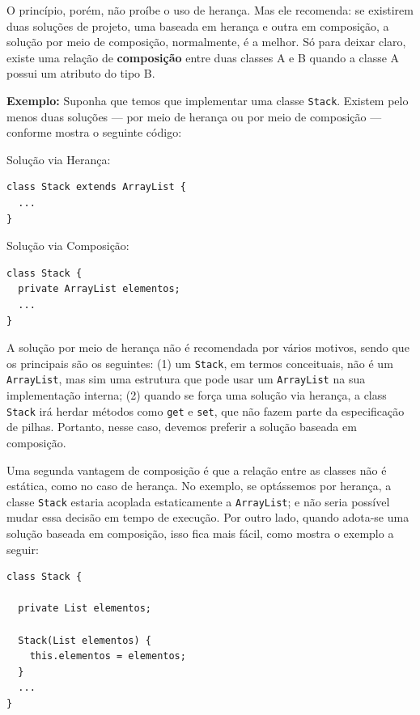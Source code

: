 \documentclass[
  11pt,
  twoside]{book}
\newcommand{\passthrough}[1]{#1}
\begin{document}
 O princípio, porém, não proíbe o uso de herança. Mas
ele recomenda: se existirem duas soluções de projeto, uma baseada em
herança e outra em composição, a solução por meio de composição,
normalmente, é a melhor. Só para deixar claro, existe uma relação de
\textbf{composição} entre duas classes A e B quando a classe A possui um
atributo do tipo B.

\textbf{Exemplo:} Suponha que temos que implementar uma classe
\passthrough{\lstinline!Stack!}. Existem pelo menos duas soluções ---
por meio de herança ou por meio de composição --- conforme mostra o
seguinte código:

Solução via Herança:

\begin{lstlisting}
class Stack extends ArrayList {
  ...
}
\end{lstlisting}

Solução via Composição:

\begin{lstlisting}
class Stack {
  private ArrayList elementos;
  ...
}
\end{lstlisting}

A solução por meio de herança não é recomendada por vários motivos,
sendo que os principais são os seguintes: (1) um
\passthrough{\lstinline!Stack!}, em termos conceituais, não é um
\passthrough{\lstinline!ArrayList!}, mas sim uma estrutura que pode usar
um \passthrough{\lstinline!ArrayList!} na sua implementação interna; (2)
quando se força uma solução via herança, a class
\passthrough{\lstinline!Stack!} irá herdar métodos como
\passthrough{\lstinline!get!} e \passthrough{\lstinline!set!}, que não
fazem parte da especificação de pilhas. Portanto, nesse caso, devemos
preferir a solução baseada em composição.

Uma segunda vantagem de composição é que a relação entre as classes não
é estática, como no caso de herança. No exemplo, se optássemos por
herança, a classe \passthrough{\lstinline!Stack!} estaria acoplada
estaticamente a \passthrough{\lstinline!ArrayList!}; e não seria
possível mudar essa decisão em tempo de execução. Por outro lado, quando
adota-se uma solução baseada em composição, isso fica mais fácil, como
mostra o exemplo a seguir:

\begin{lstlisting}
class Stack {

  private List elementos;

  Stack(List elementos) {
    this.elementos = elementos;
  }
  ...
}
\end{lstlisting}
\end{document}
